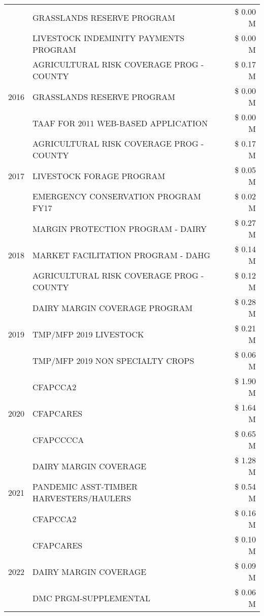 \begin{tabular}{llr}
 & GRASSLANDS RESERVE PROGRAM & \$ 0.00 M \\
 & LIVESTOCK INDEMINITY PAYMENTS PROGRAM & \$ 0.00 M \\
\cline{1-3}
\multirow[t]{3}{*}{2016} & AGRICULTURAL RISK COVERAGE PROG - COUNTY & \$ 0.17 M \\
 & GRASSLANDS RESERVE PROGRAM & \$ 0.00 M \\
 & TAAF FOR 2011 WEB-BASED APPLICATION & \$ 0.00 M \\
\cline{1-3}
\multirow[t]{3}{*}{2017} & AGRICULTURAL RISK COVERAGE PROG - COUNTY & \$ 0.17 M \\
 & LIVESTOCK FORAGE PROGRAM & \$ 0.05 M \\
 & EMERGENCY CONSERVATION PROGRAM FY17 & \$ 0.02 M \\
\cline{1-3}
\multirow[t]{3}{*}{2018} & MARGIN PROTECTION PROGRAM - DAIRY & \$ 0.27 M \\
 & MARKET FACILITATION PROGRAM - DAHG & \$ 0.14 M \\
 & AGRICULTURAL RISK COVERAGE PROG - COUNTY & \$ 0.12 M \\
\cline{1-3}
\multirow[t]{3}{*}{2019} & DAIRY MARGIN COVERAGE PROGRAM & \$ 0.28 M \\
 & TMP/MFP 2019 LIVESTOCK & \$ 0.21 M \\
 & TMP/MFP 2019 NON SPECIALTY CROPS & \$ 0.06 M \\
\cline{1-3}
\multirow[t]{3}{*}{2020} & CFAPCCA2 & \$ 1.90 M \\
 & CFAPCARES & \$ 1.64 M \\
 & CFAPCCCCA & \$ 0.65 M \\
\cline{1-3}
\multirow[t]{3}{*}{2021} & DAIRY MARGIN COVERAGE & \$ 1.28 M \\
 & PANDEMIC ASST-TIMBER HARVESTERS/HAULERS & \$ 0.54 M \\
 & CFAPCCA2 & \$ 0.16 M \\
\cline{1-3}
\multirow[t]{3}{*}{2022} & CFAPCARES & \$ 0.10 M \\
 & DAIRY MARGIN COVERAGE & \$ 0.09 M \\
 & DMC PRGM-SUPPLEMENTAL & \$ 0.06 M \\
\cline{1-3}
\bottomrule
\end{tabular}
